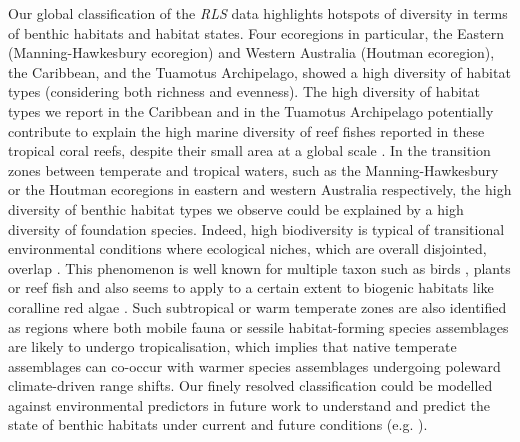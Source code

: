 \begin{refsection}
Our global classification of the \emph{RLS} data highlights hotspots of
diversity in terms of benthic habitats and habitat states. Four
ecoregions in particular, the Eastern (Manning-Hawkesbury ecoregion) and
Western Australia (Houtman ecoregion), the Caribbean, and the Tuamotus
Archipelago, showed a high diversity of habitat types (considering both
richness and evenness). The high diversity of habitat types we report in
the Caribbean and in the Tuamotus Archipelago potentially contribute to
explain the high marine diversity of reef fishes reported in these
tropical coral reefs, despite their small area at a global scale
\autocite{Cowman_2017}. In the transition zones between temperate and
tropical waters, such as the Manning-Hawkesbury or the Houtman
ecoregions in eastern and western Australia respectively, the high
diversity of benthic habitat types we observe could be explained by a
high diversity of foundation species. Indeed, high biodiversity is
typical of transitional environmental conditions where ecological
niches, which are overall disjointed, overlap \autocite{Ferro_2014}.
This phenomenon is well known for multiple taxon such as birds
\autocite{Altamirano_2020}, plants \autocite{Lemessa_2023} or reef fish
\autocite{Pinheiro_2018} and also seems to apply to a certain extent to
biogenic habitats like coralline red algae \autocite{Sissini_2022}. Such
subtropical or warm temperate zones are also identified as regions where
both mobile fauna \autocite{Verges_2014} or sessile habitat-forming
species assemblages \autocite{Marzloff_2018} are likely to undergo
tropicalisation, which implies that native temperate assemblages can
co-occur with warmer species assemblages undergoing poleward
climate-driven range shifts. Our finely resolved classification could be
modelled against environmental predictors in future work to understand
and predict the state of benthic habitats under current and future
conditions (e.g. \textcite{Belanger_2012}).


\end{refsection}
